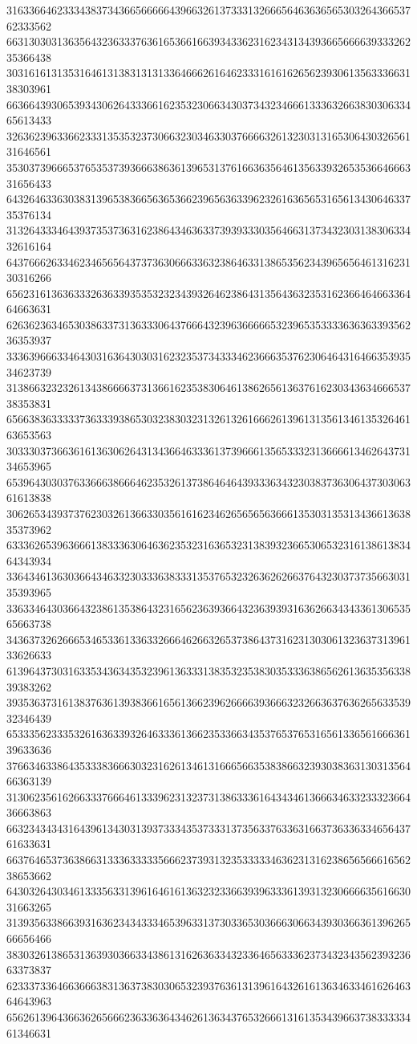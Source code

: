 31633664623334383734366566666439663261373331326665646363656530326436653762333562
66313030313635643236333763616536616639343362316234313439366566663933326235366438
30316161313531646131383131313364666261646233316161626562393061356333663138303961
66366439306539343062643336616235323066343037343234666133363266383030633465613433
32636239633662333135353237306632303463303766663261323031316530643032656131646561
35303739666537653537393666386361396531376166363564613563393265353664666331656433
64326463363038313965383665636536623965636339623261636565316561343064633735376134
31326433346439373537363162386434636337393933303564663137343230313830633432616164
64376662633462346565643737363066633632386463313865356234396565646131623130316266
65623161363633326363393535323234393264623864313564363235316236646466336464663631
62636236346530386337313633306437666432396366666532396535333363636339356236353937
33363966633464303163643030316232353734333462366635376230646431646635393534623739
31386632323261343866663731366162353830646138626561363761623034363466653738353831
65663836333337363339386530323830323132613261666261396131356134613532646163653563
30333037366361613630626431343664633361373966613565333231366661346264373134653965
65396430303763366638666462353261373864646439333634323038373630643730306361613838
30626534393737623032613663303561616234626565656366613530313531343661363835373962
63336265396366613833363064636235323163653231383932366530653231613861383464343934
33643461363036643463323033363833313537653232636262663764323037373566303135393965
33633464303664323861353864323165623639366432363939316362663434336130653565663738
34363732626665346533613363326664626632653738643731623130306132363731396133626633
61396437303163353436343532396136333138353235383035333638656261363535633839383262
39353637316138376361393836616561366239626666393666323266363763626563353932346439
65333562333532616363393264633361366235336634353765376531656133656166636139633636
37663463386435333836663032316261346131666566353838663239303836313031356466363139
31306235616266333766646133396231323731386333616434346136663463323332366436663863
66323434343164396134303139373334353733313735633763363166373633633465643761633631
66376465373638663133363333356662373931323533333463623131623865656661656238653662
64303264303461333563313961646161363232336639396333613931323066663561663031663265
31393563386639316362343433346539633137303365303666306634393036636139626566656466
38303261386531363930366334386131626363343233646563336237343234356239323663373837
62333733646636663831363738303065323937636131396164326161363463346162646364643963
65626139643663626566623633636434626136343765326661316135343966373833333461346631
